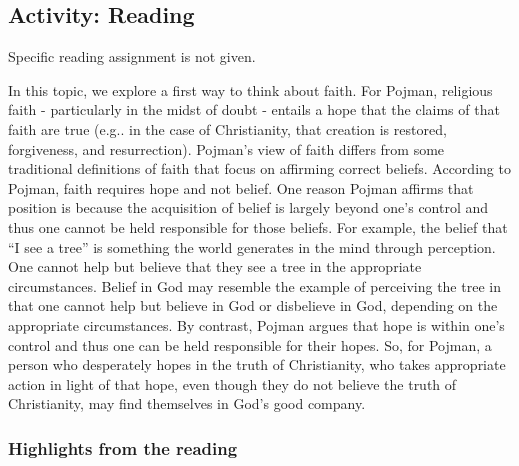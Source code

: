 \documentclass[
]{book}
\begin{document}
\hypertarget{activity-reading-5}{%
\subsection*{Activity: Reading}\label{activity-reading-5}}

\begin{reflect}
{Specific reading assignment is not given.}
\end{reflect}

In this topic, we explore a first way to think about faith. For Pojman, religious faith - particularly in the midst of doubt - entails a hope that the claims of that faith are true (e.g.. in the case of Christianity, that creation is restored, forgiveness, and resurrection). Pojman's view of faith differs from some traditional definitions of faith that focus on affirming correct beliefs. According to Pojman, faith requires hope and not belief. One reason Pojman affirms that position is because the acquisition of belief is largely beyond one's control and thus one cannot be held responsible for those beliefs. For example, the belief that ``I see a tree'' is something the world generates in the mind through perception. One cannot help but believe that they see a tree in the appropriate circumstances. Belief in God may resemble the example of perceiving the tree in that one cannot help but believe in God or disbelieve in God, depending on the appropriate circumstances. By contrast, Pojman argues that hope is within one's control and thus one can be held responsible for their hopes. So, for Pojman, a person who desperately hopes in the truth of Christianity, who takes appropriate action in light of that hope, even though they do not believe the truth of Christianity, may find themselves in God's good company.

\hypertarget{highlights-from-the-reading}{%
\subsubsection*{Highlights from the reading}\label{highlights-from-the-reading}}
\end{document}
